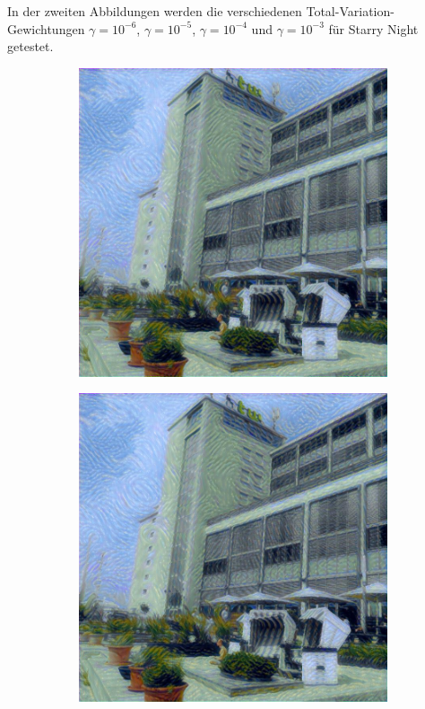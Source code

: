 In der zweiten Abbildungen werden die verschiedenen Total-Variation-Gewichtungen $ \gamma = 10^{-6} $, $ \gamma = 10^{-5} $, $ \gamma = 10^{-4} $ und $ \gamma = 10^{-3} $  für Starry Night getestet.

\begin{figure}[H]
    \centering
    \begin{subfigure}[h]{0.24\textwidth}
        \centering
        \includegraphics[width=\textwidth]{resources/content/experiments/b__the_starry_night__768x768__style-weight_1e+08__tv-weight_1e-06.jpg}
    \end{subfigure}
    \begin{subfigure}[h]{0.24\textwidth}
        \centering
        \includegraphics[width=\textwidth]{resources/content/experiments/b__the_starry_night__768x768__style-weight_1e+08__tv-weight_1e-05.jpg}

\end{subfigure}
\end{figure}
